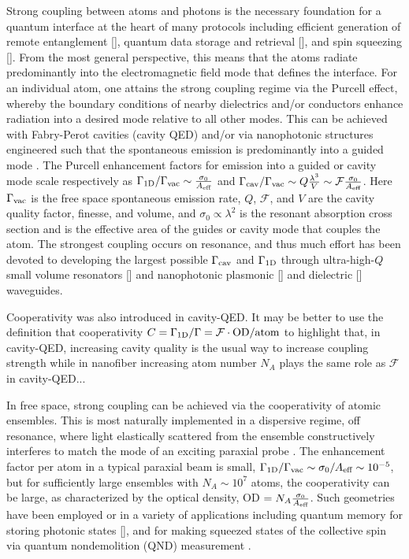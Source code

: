 \documentclass[preprint,aps,pra,onecolumn]{revtex4-1} %
\newcommand{\oneD}{{\rm 1D}}
\newcommand{\vac}{{\rm vac}}
\newcommand{\cav}{{\rm cav}}
\newcommand{\comment}[1]{{\color{Maroon} #1}}
\begin{document}
Strong coupling between atoms and photons is the necessary foundation for a quantum interface at the 
heart of many protocols including efficient generation of remote entanglement [], quantum data storage 
and retrieval [], and  spin squeezing []. From the most general perspective, this means that the atoms 
radiate predominantly into the electromagnetic field mode that defines the interface.  For an 
individual atom, one attains the strong coupling regime via the Purcell effect, whereby the boundary 
conditions of nearby dielectrics and/or conductors enhance radiation into a desired mode relative to all 
other modes.  This can be achieved with Fabry-Perot cavities (cavity QED) \cite{} and/or via nanophotonic structures engineered such that the spontaneous emission is predominantly into a guided mode \cite{manga_rao_single_2007,hakuta_manipulating_2012, hung_trapped_2013}.  The Purcell enhancement factors for emission into a guided or cavity mode scale respectively as  $ \Gamma_{\oneD}/\Gamma_{\vac} \sim \frac{\sigma_0}{A_{\eff}}$ and  
$\Gamma_{\cav}/\Gamma_{\vac} \sim   Q \frac{\lambda^3}{V}\sim \mathcal{F}  \frac{\sigma_0}{A_{\eff}}$.  
Here $\Gamma_{\vac}$ is the free space spontaneous emission rate, $Q$, $\mathcal{F}$, and $V$ are the cavity quality factor, finesse, and volume, and $\sigma_0 \propto \lambda^2$ is the resonant absorption cross 
section and is the effective area of the guides or cavity mode that couples the atom.  The strongest 
coupling occurs on resonance, and thus much effort has been devoted to developing the largest possible 
$\Gamma_{\cav}$ and $\Gamma_{\oneD}$ through ultra-high-$Q$ small volume resonators [] and 
nanophotonic plasmonic [] and dielectric [] waveguides.  

\comment{Cooperativity was also introduced in cavity-QED. It may be better to use the definition that cooperativity $C=\Gamma_{\rm 1D}/\Gamma=\mathcal{F}\cdot\mathrm{OD}/\mathrm{atom}$ to highlight that, in cavity-QED, increasing cavity quality is the usual way to increase coupling strength while in nanofiber increasing atom number $ N_A $ plays the same role as $ \mathcal{F} $ in cavity-QED...}

In free space, strong coupling can be achieved via the cooperativity of atomic ensembles.  This is most 
naturally implemented in a dispersive regime, off resonance, where light elastically scattered 
from the ensemble constructively interferes to match the mode of an exciting paraxial probe \cite{baragiola_three-dimensional_2014}.  The enhancement factor per atom in a typical paraxial beam is small, $\Gamma_{\oneD}/\Gamma_{\vac} \sim \sigma_0/A_{\eff}  \sim 10^{-5}$, but for sufficiently large ensembles with $N_A \sim  10^7$ atoms, the cooperativity can be large, as characterized by the optical density, OD $= N_A \frac{\sigma_0}{A_{\text{eff}}}$.  Such geometries have been employed or in a variety of applications including quantum memory for storing photonic states [], and for  making squeezed states of the collective spin via quantum nondemolition (QND) measurement \cite{kuzmich_generation_2000}.   
\end{document}
